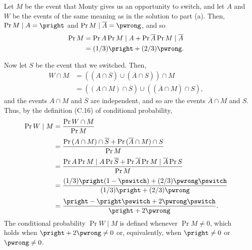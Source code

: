 Let $M$ be the event that Monty gives us an opportunity to switch, and let $A$ and $W$ be the events of the same meaning as in the solution to part (a).
Then, $\Pr{M\mid A}=\pright$ and $\Pr{M\mid\overline{A}}=\pwrong$, and so
\begin{align*}
    \Pr{M} &= \Pr{A}\Pr{M\mid A}+\Pr{\overline{A}}\Pr{M\mid\overline{A}} \\
    &= (1/3)\pright+(2/3)\pwrong.
\end{align*}

Now let $S$ be the event that we switched.
Then,
\begin{align*}
    W\cap M &= \left((A\cap\overline{S})\cup(\overline{A}\cap S)\right)\cap M \\
    &= \left((A\cap M)\cap\overline{S}\right)\cup\left((\overline{A}\cap M)\cap S\right),
\end{align*}
and the events $A\cap M$ and $\overline{S}$ are independent, and so are the events $\overline{A}\cap M$ and $S$.
Thus, by the definition (C.16) of conditional probability,
\begin{align*}
    \Pr{W\mid M} &= \frac{\Pr{W\cap M}}{\Pr{M}} \\[1mm]
    &= \frac{\Pr{(A\cap M)\cap\overline{S}}+\Pr{(\overline{A}\cap M)\cap S}}{\Pr{M}} \\[1mm]
    &= \frac{\Pr{A}\Pr{M\mid A}\Pr{\overline{S}}+\Pr{\overline{A}}\Pr{M\mid\overline{A}}\Pr{S}}{\Pr{M}} \\[1mm]
    &= \frac{(1/3)\pright(1-\pswitch)+(2/3)\pwrong\pswitch}{(1/3)\pright+(2/3)\pwrong} \\[1mm]
    &= \frac{\pright-\pright\pswitch+2\pwrong\pswitch}{\pright+2\pwrong}.
\end{align*}
The conditional probability $\Pr{W\mid M}$ is defined whenever $\Pr{M}\ne0$, which holds when $\pright+2\pwrong\ne0$ or, equivalently, when $\pright\ne0$ or $\pwrong\ne0$.
